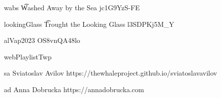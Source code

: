 \E wabs
\t Washed Away by the Sea
\youtubeCode jc1G9YzS-FE

\E lookingGlass
\t Trought the Looking Glass
\youtubeCode l3SDPKj5M_Y

\E alVap2023
\youtubeCode OS8vnQA48lo

\E webPlaylistTwp

\E sa
\name Sviatoslav Avilov
\cvWebsite https://thewhaleproject.github.io/sviatoslavavilov

\E ad 
\name Anna Dobrucka
\cvWebsite https://annadobrucka.com
